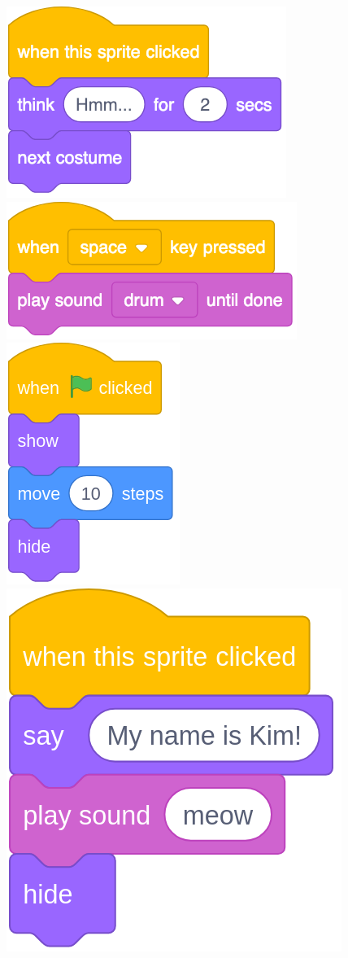 \documentclass[letterpaper,12pt]{article}
\begin{document}
\includegraphics[scale=.3,valign=t]{q3_script0.png} \hspace{1cm}
\includegraphics[scale=.3,valign=t]{q3_script1.png} \hspace{1cm}
\includegraphics[scale=.3,valign=t]{q3_script2.png} \hspace{1cm}
\includegraphics[scale=.2,valign=t]{q3_script3.png} \hspace{1cm}
\end{document}

